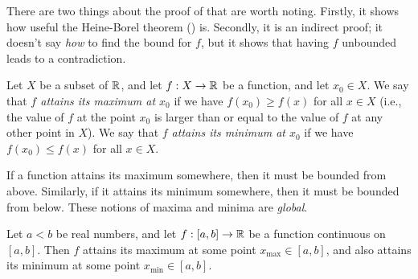 \begin{rmk}\label{i:9.6.4}
  There are two things about the proof of  that are worth noting.
  Firstly, it shows how useful the Heine-Borel theorem () is.
  Secondly, it is an indirect proof;
  it doesn't say \emph{how} to find the bound for \(f\), but it shows that having \(f\) unbounded leads to a contradiction.
\end{rmk}

\begin{defn}\label{i:9.6.5}
  Let \(X\) be a subset of \(\mathbb{R}\), and let \(f : X \to \mathbb{R}\) be a function, and let \(x_0 \in X\).
  We say that \emph{\(f\) attains its maximum at \(x_0\)} if we have \(f(x_0) \geq f(x)\) for all \(x \in X\)
  (i.e., the value of \(f\) at the point \(x_0\) is larger than or equal to the value of \(f\) at any other point in \(X\)).
  We say that \emph{\(f\) attains its minimum at \(x_0\)} if we have \(f(x_0) \leq f(x)\) for all \(x \in X\).
\end{defn}

\begin{rmk}\label{i:9.6.6}
  If a function attains its maximum somewhere, then it must be bounded from above.
  Similarly, if it attains its minimum somewhere, then it must be bounded from below.
  These notions of maxima and minima are \emph{global}.
\end{rmk}

\begin{prop}\label{i:9.6.7}
  Let \(a < b\) be real numbers, and let \(f : [a, b] \to \mathbb{R}\) be a function continuous on \([a, b]\).
  Then \(f\) attains its maximum at some point \(x_{\max} \in [a, b]\), and also attains its minimum at some point \(x_{\min} \in [a, b]\).
\end{prop}

